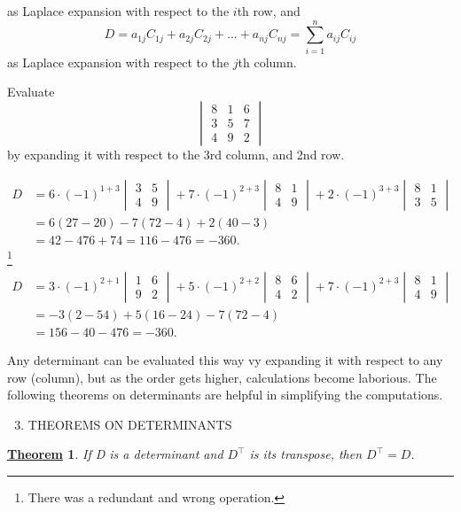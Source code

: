 \documentclass[11pt]{amsbook}
\newtheorem*{theorem}{\underline{Theorem}}
\begin{document}
as Laplace expansion with respect to the $i$th row, and
\begin{equation}
D = a_{1j}C_{1j} + a_{2j}C_{2j} + ... + a_{nj}C_{nj} = \sum_{i=1}^n a_{ij}C_{ij}
\end{equation}
as Laplace expansion with respect to the $j$th column.
\begin{exmp}
Evaluate
$$
\begin{vmatrix}
	8 & 1 & 6 \\
	3 & 5 & 7 \\
	4 & 9 & 2
\end{vmatrix}
$$
by expanding it with respect to the 3rd column, and 2nd row.
\end{exmp}
\begin{hSolution}
\begin{align*}
D&=6\cdot(-1)^{1+3}
\begin{vmatrix}
  3 & 5 \\
  4 & 9
\end{vmatrix}
+7\cdot(-1)^{2+3}
\begin{vmatrix}
  8 & 1 \\
  4 & 9
\end{vmatrix}
+2\cdot(-1)^{3+3}
\begin{vmatrix}
  8 & 1 \\
  3 & 5
\end{vmatrix}\\
&=6(27-20)-7(72-4)+2(40-3)\\
&=42-476+74=116-476=-360.
\end{align*} \footnote{There was a redundant and wrong operation.}
\begin{align*}
D&=3\cdot(-1)^{2+1}
\begin{vmatrix}
  1 & 6 \\
  9 & 2
\end{vmatrix}
+5\cdot(-1)^{2+2}
\begin{vmatrix}
  8 & 6 \\
  4 & 2
\end{vmatrix}
+7\cdot(-1)^{2+3}
\begin{vmatrix}
  8 & 1 \\
  4 & 9
\end{vmatrix}\\
&=-3(2-54)+5(16-24)-7(72-4)\\
&=156-40-476=-360.
\end{align*}
\end{hSolution}
\par Any determinant can be evaluated this way vy expanding it with respect to any row (column), but as the order gets higher, calculations become laborious. The following theorems on determinants are helpful in simplifying the computations.\\
\begin{enumerate}[label=(\Alph*)]
\setcounter{enumi}{2}
\item  THEOREMS ON DETERMINANTS
\end{enumerate}
\begin{theorem}
If D is a determinant and $D^{\top}$ is its transpose, then $D^{\top} = D$.\\
\end{theorem}
 
\end{document}

